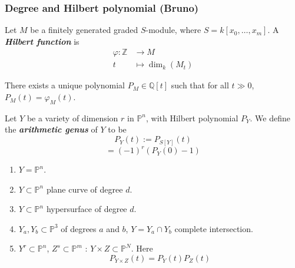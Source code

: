 \subsubsection{Degree and Hilbert polynomial (Bruno)}


\begin{defn}
	Let $M$ be a finitely generated graded $S$-module, where $S=k[x_0,\ldots,x_m]$. A \textit{\textbf{Hilbert function}} is
	\begin{align*}
		\varphi: \mathbb{Z} &\longrightarrow M \\
		t &\longmapsto \dim_k(M_t)
	\end{align*}
\end{defn}

\begin{thm}
	There exists a unique polynomial $P_M\in\mathbb{Q}[t]$ such that for all $t\gg 0$, $P_M(t)=\varphi_M(t)$.
\end{thm}

\begin{manualexercise}{7.2}
	Let $Y$ be a variety of dimension $r$ in $\mathbb{P}^n$, with Hilbert polynomial $P_Y$. We define the \textit{\textbf{arithmetic genus}} of $Y$ to be
	\[P_Y(t):=P_{S[Y]}(t)\]
	\[=(-1)^r(P_Y(0)-1)\]
	\begin{enumerate}[label=\alph*.]
		\item  $Y=\mathbb{P}^n$.
		\item $Y\subset \mathbb{P}^n$ plane curve of degree $d$.
		\item $ Y\subset \mathbb{P}^n$ hypersurface of degree $d$.
		\item $Y_a,Y_b\subset \mathbb{P}^3$ of degrees $a$ and $b$, $Y =Y_a\cap Y_b$ complete intersection.
		\item $Y^r\subset \mathbb{P}^n$, $Z^s\subset \mathbb{P}^m$ : $Y\times Z\subset \mathbb{P}^N$. Here
			\[P_{Y\times Z}(t)=P_Y(t)P_Z(t)\]
	\end{enumerate}
\end{manualexercise}

